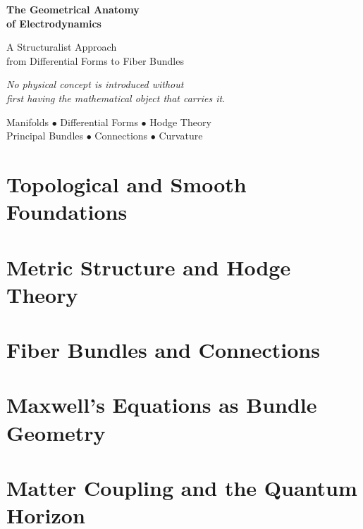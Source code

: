 \documentclass[12pt,a4paper]{book}
\theoremstyle{definition}
\theoremstyle{plain}
\theoremstyle{remark}
\begin{document}
\begin{titlepage}
\centering
\vspace*{2cm}
{\Huge\bfseries The Geometrical Anatomy\\[0.4em] of Electrodynamics\par}
\vspace{1.5cm}
{\Large A Structuralist Approach\\[0.3em]
from Differential Forms to Fiber Bundles\par}
\vspace{2cm}
{\large\itshape No physical concept is introduced without\\[0.2em]
first having the mathematical object that carries it.\par}
\vspace{3cm}
{\large Manifolds $\bullet$ Differential Forms $\bullet$ Hodge Theory\\[0.3em]
Principal Bundles $\bullet$ Connections $\bullet$ Curvature\par}
\vfill
\end{titlepage}

\frontmatter
\tableofcontents

\mainmatter

\part{Topological and Smooth Foundations}




\part{Metric Structure and Hodge Theory}



\part{Fiber Bundles and Connections}





\part{Maxwell's Equations as Bundle Geometry}




\part{Matter Coupling and the Quantum Horizon}



\end{document}
